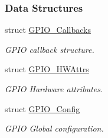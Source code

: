 \subsubsection*{Data Structures}
\begin{DoxyCompactItemize}
\item 
struct \hyperlink{struct_g_p_i_o___callbacks}{G\-P\-I\-O\-\_\-\-Callbacks}
\begin{DoxyCompactList}\small\item\em G\-P\-I\-O callback structure. \end{DoxyCompactList}\item 
struct \hyperlink{struct_g_p_i_o___h_w_attrs}{G\-P\-I\-O\-\_\-\-H\-W\-Attrs}
\begin{DoxyCompactList}\small\item\em G\-P\-I\-O Hardware attributes. \end{DoxyCompactList}\item 
struct \hyperlink{struct_g_p_i_o___config}{G\-P\-I\-O\-\_\-\-Config}
\begin{DoxyCompactList}\small\item\em G\-P\-I\-O Global configuration. \end{DoxyCompactList}\end{DoxyCompactItemize}
